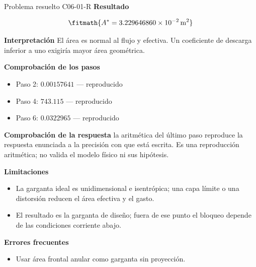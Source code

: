 \documentclass[10pt,openany]{book}
\begin{document}
\begin{studiumworked}{Problema resuelto C06-01-R}
\noindent\textbf{Resultado}

\[
\fitmath{A^{*}=3.229646860\times10^{-2}\,\mathrm{m}^{2}}
\]

\noindent\textbf{Interpretación}
El área es normal al flujo y efectiva. Un coeficiente de descarga inferior a uno exigiría mayor área geométrica.

\noindent\textbf{Comprobación de los pasos}
\begin{itemize}
\item Paso 2: $0.00157641$ — reproducido
\item Paso 4: $743.115$ — reproducido
\item Paso 6: $0.0322965$ — reproducido
\end{itemize}

\noindent\textbf{Comprobación de la respuesta} la aritmética del último paso reproduce la respuesta enunciada a la precisión con que está escrita. Es una reproducción aritmética; no valida el modelo físico ni sus hipótesis.

\noindent\textbf{Limitaciones}
\begin{itemize}
\item La garganta ideal es unidimensional e isentrópica; una capa límite o una distorsión reducen el área efectiva y el gasto.
\item El resultado es la garganta de diseño; fuera de ese punto el bloqueo depende de las condiciones corriente abajo.
\end{itemize}

\noindent\textbf{Errores frecuentes}
\begin{itemize}
\item Usar área frontal anular como garganta sin proyección.
\end{itemize}
\end{studiumworked}
\end{document}
